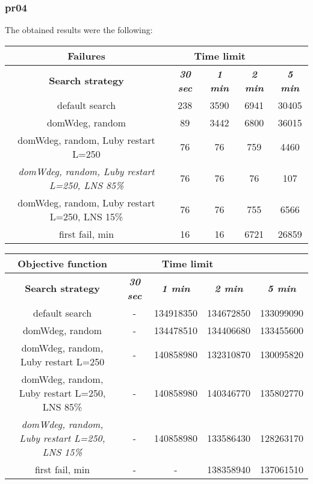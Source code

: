 \subsubsection{pr04}
The obtained results were the following:
{
\renewcommand{\arraystretch}{2}
\begin{longtable}[h]{| c | c | c | c | c |}
    \hline
    \textbf{Failures} & \multicolumn{3}{c}{Time limit} & \\
    \hline
    \textbf{Search strategy} & \textbf{\textit{30 sec}} & \textbf{\textit{1 min}} & \textbf{\textit{2 min}} & \textbf{\textit{5 min}} \\
    \hline
    \endhead
    default search                                         & 238 &  3590 &  6941 &  30405 \\
    \hline
    domWdeg, random                                        &  89 &  3442 &  6800 &  36015 \\
    \hline
    domWdeg, random, Luby restart L=250                    &  76 &    76 &   759 &   4460 \\
    \hline
    \textit{domWdeg, random, Luby restart L=250, LNS 85\%} &  76 &    76 &    76 &    107 \\
    \hline
    domWdeg, random, Luby restart L=250, LNS 15\%          &  76 &    76 &   755 &   6566 \\
    \hline
    first fail, min                                        &  16 &    16 &  6721 &  26859 \\
    \hline
\end{longtable}
}

{
\renewcommand{\arraystretch}{2}
\begin{longtable}[h]{| c | c | c | c | c |}
    \hline
    \textbf{Objective function} & \multicolumn{3}{c}{Time limit} & \\
    \hline
    \textbf{Search strategy} & \textbf{\textit{30 sec}} & \textbf{\textit{1 min}} & \textbf{\textit{2 min}} & \textbf{\textit{5 min}} \\
    \hline
    \endhead
    default search                                         &         - & 134918350 & 134672850 & 133099090 \\
    \hline
    domWdeg, random                                        &         - & 134478510 & 134406680 & 133455600 \\
    \hline
    domWdeg, random, Luby restart L=250                    &         - & 140858980 & 132310870 & 130095820 \\
    \hline
    domWdeg, random, Luby restart L=250, LNS 85\%          &         - & 140858980 & 140346770 & 135802770 \\
    \hline
    \textit{domWdeg, random, Luby restart L=250, LNS 15\%} &         - & 140858980 & 133586430 & 128263170 \\
    \hline
    first fail, min                                        &        - &         - & 138358940 & 137061510 \\
    \hline
\end{longtable}
}